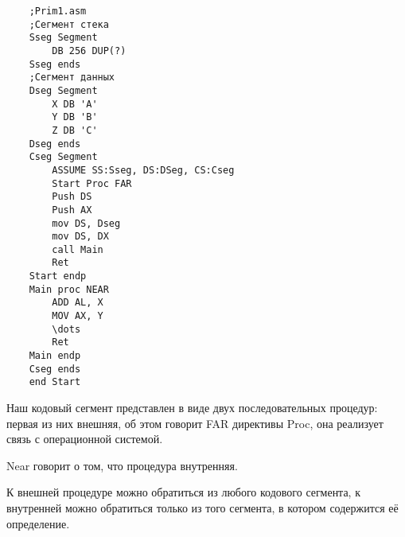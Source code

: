 \begin{verbatim}
    ;Prim1.asm
    ;Сегмент стека
    Sseg Segment
        DB 256 DUP(?)
    Sseg ends
    ;Сегмент данных
    Dseg Segment
        X DB 'A'
        Y DB 'B'
        Z DB 'C'
    Dseg ends
    Cseg Segment
        ASSUME SS:Sseg, DS:DSeg, CS:Cseg
        Start Proc FAR
        Push DS
        Push AX
        mov DS, Dseg
        mov DS, DX
        call Main
        Ret
    Start endp
    Main proc NEAR
        ADD AL, X
        MOV AX, Y
        \dots
        Ret
    Main endp
    Cseg ends
    end Start
\end{verbatim}

Наш кодовый сегмент представлен в виде двух последовательных процедур: первая из них
внешняя, об этом говорит FAR директивы Proc, она реализует связь с операционной системой.

Near говорит о том, что процедура внутренняя.

К внешней процедуре можно обратиться из любого кодового сегмента, к внутренней можно обратиться
только из того сегмента, в котором содержится её определение.
